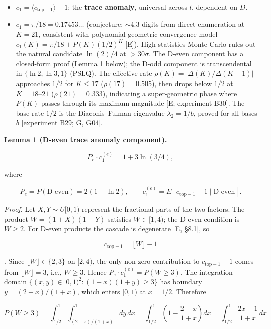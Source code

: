 \documentclass[
  11pt,
]{article}
\providecommand{\tightlist}{%
  \setlength{\itemsep}{0pt}\setlength{\parskip}{0pt}}
\begin{document}
\begin{itemize}
\tightlist
\item
  \(c_1 = \langle c_{\text{top}-1}\rangle - 1\): the \textbf{trace anomaly},
  universal across \(l\), dependent on \(D\).
\item
  \(c_1 = \pi/18 = 0.17453\ldots\) (conjecture; \({\sim}4.3\) digits from direct
  enumeration at \(K = 21\), consistent with polynomial-geometric convergence
  model \(c_1(K) = \pi/18 + P(K)(1/2)^K\) {[}E{]}). High-statistics Monte Carlo
  rules out the natural candidate \(\ln(2)/4\) at \(> 30\sigma\). The D-even
  component has a closed-form proof (Lemma 1 below); the D-odd component is
  transcendental in \(\lbrace{}\ln 2, \ln 3, 1\rbrace{}\) (PSLQ). The effective
  rate \(\rho(K) = |\Delta(K)/\Delta(K{-}1)|\) approaches \(1/2\) for
  \(K \leq 17\) (\(\rho(17) = 0.505\)), then drops below \(1/2\) at
  \(K = 18\)--\(21\) (\(\rho(21) = 0.333\)), indicating a super-geometric phase
  where \(P(K)\) passes through its maximum magnitude {[}E; experiment B30{]}.
  The base rate \(1/2\) is the Diaconis--Fulman eigenvalue \(\lambda_2 = 1/b\),
  proved for all bases \(b\) {[}experiment B29; G, G04{]}.
\end{itemize}

\textbf{Lemma 1 (D-even trace anomaly component).}

\[P_e \cdot c_1^{(e)} = 1 + 3\ln(3/4),\]

where

\[P_e = P(\text{D-even}) = 2(1-\ln 2), \qquad c_1^{(e)} = E[c_{\mathrm{top}-1} - 1 \mid \text{D-even}].\]

\emph{Proof.} Let \(X, Y \sim U[0,1)\) represent the fractional parts of the two
factors. The product \(W = (1+X)(1+Y)\) satisfies \(W \in [1,4)\); the D-even
condition is \(W \geq 2\). For D-even products the cascade is degenerate {[}E,
§8.1{]}, so

\[c_{\mathrm{top}-1} = \lfloor W \rfloor - 1\]

. Since \(\lfloor W \rfloor \in \lbrace{}2, 3\rbrace{}\) on \([2, 4)\), the only
non-zero contribution to \(c_{\mathrm{top}-1} - 1\) comes from
\(\lfloor W \rfloor = 3\), i.e., \(W \geq 3\). Hence
\(P_e \cdot c_1^{(e)} = P(W \geq 3)\). The integration domain
\(\lbrace{}(x,y) \in [0,1)^2 : (1+x)(1+y) \geq 3\rbrace{}\) has boundary
\(y = (2-x)/(1+x)\), which enters \([0,1)\) at \(x = 1/2\). Therefore

\[P(W \geq 3) = \int_{1/2}^{1}\!\int_{(2-x)/(1+x)}^{1} dy\,dx = \int_{1/2}^{1}\!\left(1 - \frac{2-x}{1+x}\right)dx = \int_{1/2}^{1}\frac{2x-1}{1+x}\,dx\]
\end{document}
